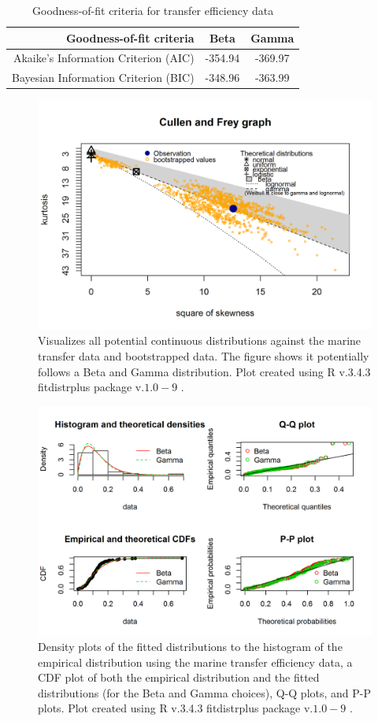 \documentclass[oneside,12pt,final]{sty/ucthesis-CA2012}
\let\cite\citep                             %
\begin{document}
\begin{mainmatter}
\begin{table}[H]
\centering
\caption{Goodness-of-fit criteria for transfer efficiency data}
\begin{tabular}{r|c|c}
  \hline \small
 Goodness-of-fit criteria & Beta  & Gamma \\ 
   \hline
   Akaike's Information Criterion (AIC) & -354.94 & -369.97 \\   
   Bayesian Information Criterion (BIC) & -348.96 &  -363.99  \\
   \hline
\end{tabular} 
\label{te_aic_a1}
\end{table}

\begin{figure}[H]
     \centering
       \includegraphics[width=.8\textwidth]{fig/cullen_frey_te}
    \caption{Visualizes all potential continuous distributions against the marine transfer data and bootstrapped data. The figure shows it potentially follows a Beta and Gamma distribution. Plot created using R v.3.4.3 \cite{Rcite} fitdistrplus package v.$1.0-9$ \cite{fitdistrplus}. }
    \label{cf_te_a1}
\end{figure}

\begin{figure}[H]
     \centering
       \includegraphics[width=.8\textwidth]{fig/gof_te}
    \caption{Density plots of the fitted distributions to the histogram of the empirical distribution using the marine transfer efficiency data, a CDF plot of both the empirical distribution and the fitted distributions (for the Beta and Gamma choices), Q-Q plots, and P-P plots. Plot created using R v.3.4.3 \cite{Rcite} fitdistrplus package v.$1.0-9$ \cite{fitdistrplus}. }
    \label{gof_te_a1}
\end{figure}


\end{mainmatter}
\end{document}
